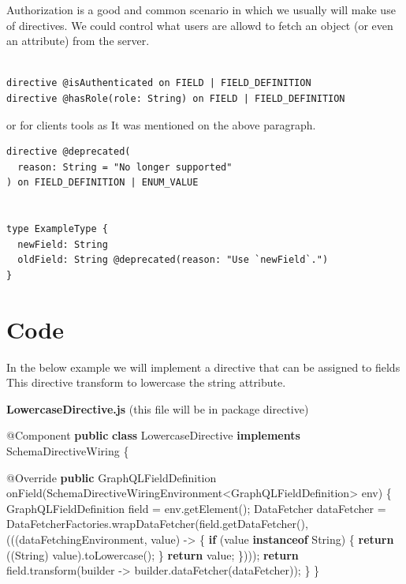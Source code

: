 \documentclass[]{book}
\newenvironment{Shaded}{\begin{snugshade}}{\end{snugshade}}
\newcommand{\KeywordTok}[1]{\textcolor[rgb]{0.13,0.29,0.53}{\textbf{#1}}}
\newcommand{\FunctionTok}[1]{\textcolor[rgb]{0.00,0.00,0.00}{#1}}
\newcommand{\BuiltInTok}[1]{#1}
\newcommand{\AttributeTok}[1]{\textcolor[rgb]{0.77,0.63,0.00}{#1}}
\newcommand{\NormalTok}[1]{#1}
\begin{document}
Authorization is a good and common scenario in which we usually will
make use of directives. We could control what users are allowd to fetch
an object (or even an attribute) from the server.

\begin{verbatim}

directive @isAuthenticated on FIELD | FIELD_DEFINITION
directive @hasRole(role: String) on FIELD | FIELD_DEFINITION

\end{verbatim}

or for clients tools as It was mentioned on the above paragraph.

\begin{verbatim}
directive @deprecated(
  reason: String = "No longer supported"
) on FIELD_DEFINITION | ENUM_VALUE


type ExampleType {
  newField: String
  oldField: String @deprecated(reason: "Use `newField`.")
}
\end{verbatim}

\section{Code}\label{code-3}

In the below example we will implement a directive that can be assigned
to fields This directive transform to lowercase the string attribute.

\textbf{LowercaseDirective.js} (this file will be in package directive)

\begin{Shaded}
\begin{Highlighting}[]
\AttributeTok{@Component}
\KeywordTok{public} \KeywordTok{class}\NormalTok{ LowercaseDirective }\KeywordTok{implements}\NormalTok{ SchemaDirectiveWiring \{}

    \AttributeTok{@Override}
    \KeywordTok{public}\NormalTok{ GraphQLFieldDefinition }\FunctionTok{onField}\NormalTok{(SchemaDirectiveWiringEnvironment<GraphQLFieldDefinition> env) \{}
\NormalTok{        GraphQLFieldDefinition field = env.}\FunctionTok{getElement}\NormalTok{();}
\NormalTok{        DataFetcher dataFetcher = DataFetcherFactories.}\FunctionTok{wrapDataFetcher}\NormalTok{(field.}\FunctionTok{getDataFetcher}\NormalTok{(), (((dataFetchingEnvironment, value) -> \{}
            \KeywordTok{if}\NormalTok{ (value }\KeywordTok{instanceof} \BuiltInTok{String}\NormalTok{) \{}
                \KeywordTok{return}\NormalTok{ ((}\BuiltInTok{String}\NormalTok{) value).}\FunctionTok{toLowercase}\NormalTok{();}
\NormalTok{            \}}
            \KeywordTok{return}\NormalTok{ value;}
\NormalTok{        \})));}
        \KeywordTok{return}\NormalTok{ field.}\FunctionTok{transform}\NormalTok{(builder -> builder.}\FunctionTok{dataFetcher}\NormalTok{(dataFetcher));}
\NormalTok{    \}}
\NormalTok{\}}
\end{Highlighting}
\end{Shaded}
\end{document}
